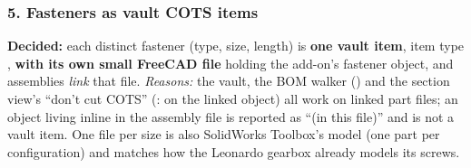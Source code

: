 \subsubsection*{5. Fasteners as vault COTS items}

\textbf{Decided:} each distinct fastener (type, size, length) is \textbf{one vault item}, item type
, \textbf{with its own small FreeCAD file} holding the add-on's fastener object, and assemblies
\emph{link} that file. \emph{Reasons:} the vault, the BOM walker () and the section
view's ``don't cut COTS'' (:  on the linked object) all work on
linked part files; an object living inline in the assembly file is reported as ``(in this file)'' and is not
a vault item. One file per size is also SolidWorks Toolbox's model (one part per configuration) and
matches how the Leonardo gearbox already models its screws.

\begin{center}
\end{center}

